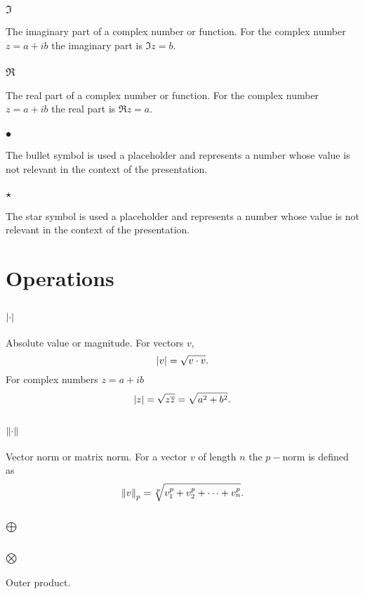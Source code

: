\subsubsection*{$\Im$}
The imaginary part of a complex number or function. For the complex number $z=a+ib$ the imaginary part is $\Im z=b$.

\subsubsection*{$\Re$}
The real part of a complex number or function. For the complex number $z=a+ib$ the real part is $\Re z=a$.

\subsubsection*{$\bullet$}
The bullet symbol is used a placeholder and represents a number whose value is not relevant in the context of the presentation.

\subsubsection*{$\star$}
The star symbol is used a placeholder and represents a number whose value is not relevant in the context of the presentation.

\section*{Operations} 

\subsection*{$\left|\cdot\right|$}
Absolute value or magnitude. For vectors $v$,
\begin{equation}
  \left|v\right|=\sqrt{v\cdot v}.
\end{equation}
For complex numbers $z=a+ib$
\begin{equation}
  \left|z\right|= \sqrt{z\overline{z}} = \sqrt{a^{2}+b^{2}}.
\end{equation}

\subsection*{$\left\lVert\cdot\right\rVert$}
Vector norm or matrix norm. For a vector $v$ of length $n$ the $p-$norm is defined as
\begin{equation}
  \left\lVert v\right\rVert_{p} = \sqrt[p]{v_{1}^{p}+v_{2}^{p}+\dots+v_{n}^{p}}.
\end{equation}

\subsection*{$\oplus$}

\subsection*{$\otimes$}
Outer product.

\endinput